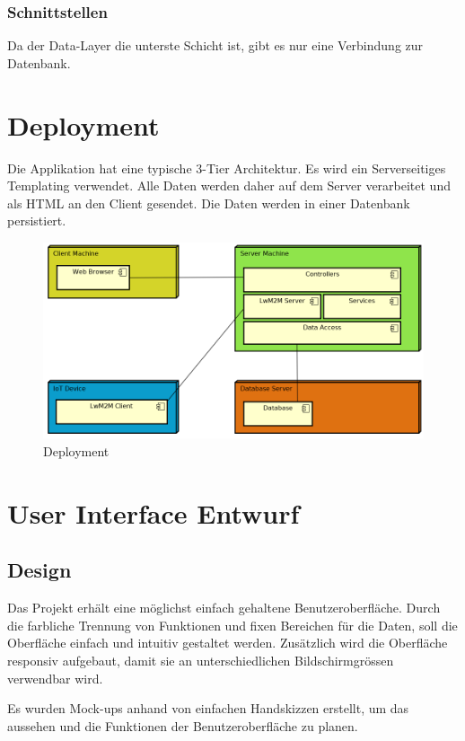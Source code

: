 \subsubsection{Schnittstellen}
Da der Data-Layer die unterste Schicht ist, gibt es nur eine Verbindung zur Datenbank.

\newpage

\section{Deployment}
Die Applikation hat eine typische 3-Tier Architektur. Es wird ein Serverseitiges Templating verwendet. Alle Daten werden daher auf dem Server verarbeitet und als HTML an den Client gesendet. Die Daten werden in einer Datenbank persistiert.
\begin{figure}[H]
\center
\includegraphics[scale=0.6]{../03_Design/images/architekturuebersicht}\caption{Deployment}
\end{figure}

\section{User Interface Entwurf}
\label{sec:mockups}
\subsection{Design}
Das Projekt erhält eine möglichst einfach gehaltene Benutzeroberfläche. Durch die farbliche Trennung von Funktionen und fixen Bereichen für die Daten, soll die Oberfläche einfach und intuitiv gestaltet werden. Zusätzlich wird die Oberfläche responsiv aufgebaut, damit sie an unterschiedlichen Bildschirmgrössen verwendbar wird.

Es wurden Mock-ups anhand von einfachen Handskizzen erstellt, um das aussehen und die Funktionen der Benutzeroberfläche zu planen.

